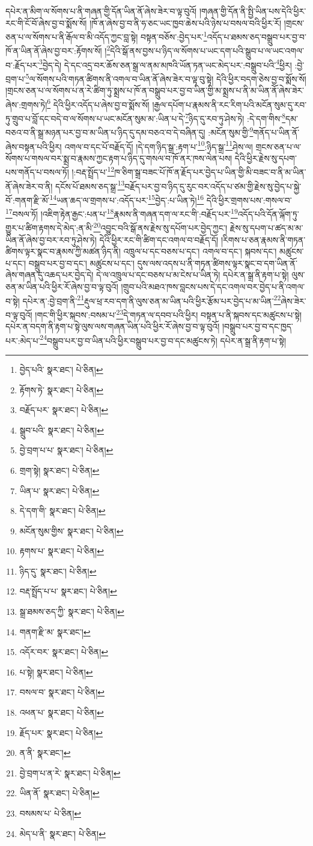 དཔེར་ན་མིག་ལ་སོགས་པ་ནི་གཞན་གྱི་དོན་ཡིན་ནོ་ཞེས་ཟེར་བ་ལྟ་བུའོ། །གཞན་གྱི་དོན་ནི་སྤྱི་ཡིན་པས་དེའི་ཕྱིར་རང་གི་ངོ་བོ་ཞེས་བྱ་བ་སྨོས་སོ། །ཁོ་ན་ཞེས་བྱ་བ་ནི་ཧ་ཅང་ཡང་ཁྱབ་ཆེས་པའི་ཉེས་པ་བསལ་བའི་ཕྱིར་རོ། །གྲངས་ཅན་པ་ལ་སོགས་པ་ནི་རྒོལ་བ་མི་འདོད་ཀྱང་བླ་སྟེ། བསྟན་བཅོས་:བྱེད་པར་\footnote{བྱེད་པའི་  སྣར་ཐང་།  པེ་ཅིན། }འདོད་པ་ཐམས་ཅད་བསྒྲུབ་པར་བྱ་བ་ཁོ་ན་ཡིན་ནོ་ཞེས་བྱ་བར་:རྟོགས་སོ། །\footnote{རྟོགས་ཏེ་  སྣར་ཐང་།  པེ་ཅིན། }དེའི་སྒོ་ནས་བྱས་པ་ཉིད་ལ་སོགས་པ་ཡང་དག་པའི་སྒྲུབ་པ་ལ་ཡང་འགལ་བ་:རྗོད་པར་\footnote{བརྗོད་པར་  སྣར་ཐང་།  པེ་ཅིན། }བྱེད་དེ། དེ་དང་འདྲ་བར་ཆོས་ཅན་སྒྲ་ལ་ནམ་མཁའི་ཡོན་ཏན་ཡང་མེད་པར་:བསྒྲུབ་པའི་\footnote{སྒྲུབ་པའི་  སྣར་ཐང་།  པེ་ཅིན། }ཕྱིར། :བྱེ་བྲག་པ་\footnote{བྱེ་བྲག་པ་པ་  སྣར་ཐང་།  པེ་ཅིན། }ལ་སོགས་པའི་གཏན་ཚིགས་ནི་འགལ་བ་ཡིན་ནོ་ཞེས་ཟེར་བ་ལྟ་བུ་སྟེ། དེའི་ཕྱིར་བདག་ཅེས་བྱ་བ་སྨོས་སོ། །གྲངས་ཅན་པ་ལ་སོགས་པ་ན་རེ་ཚིག་ཏུ་སྨྲས་པ་ཁོ་ན་བསྒྲུབ་པར་བྱ་བ་ཡིན་གྱི་མ་སྨྲས་པ་ནི་མ་ཡིན་ནོ་ཞེས་ཟེར་ཞེས་:གྲགས་ཏེ།\footnote{གྲག་སྟེ།  སྣར་ཐང་།  པེ་ཅིན། } དེའི་ཕྱིར་འདོད་པ་ཞེས་བྱ་བ་སྨོས་སོ། །རྒྱལ་དཔོག་པ་རྣམས་ནི་རང་རིག་པའི་མངོན་སུམ་དུ་རབ་ཏུ་གྲུབ་པ་བློ་དང་བདེ་བ་ལ་སོགས་པ་ཡང་མངོན་སུམ་མ་:ཡིན་པ་དེ་\footnote{ཡིན་པ་  སྣར་ཐང་།  པེ་ཅིན། }ཉིད་དུ་རབ་ཏུ་ཤེས་ཏེ། :དེ་དག་གིས་\footnote{དེ་དག་གི་  སྣར་ཐང་།  པེ་ཅིན། }དམ་བཅའ་བ་ནི་སྒྲ་མཉན་པར་བྱ་བ་མ་ཡིན་པ་ཉིད་དུ་དམ་བཅའ་བ་དེ་བཞིན་དུ། :མངོན་སུམ་གྱི་\footnote{མངོན་སུམ་གྱིས་  སྣར་ཐང་།  པེ་ཅིན། }གནོད་པ་ཡིན་ནོ་ཞེས་བསྟན་པའི་ཕྱིར། འགལ་བ་དང་པོ་བརྗོད་དོ། །དེ་དག་ཉིད་སྒྲ་:རྟག་པ་\footnote{རྟགས་པ་  སྣར་ཐང་།  པེ་ཅིན། }:ཉིད་སྒྲ་\footnote{ཉིད་དུ་  སྣར་ཐང་།  པེ་ཅིན། }ཤེས་ལ། གྲངས་ཅན་པ་ལ་སོགས་པ་གསལ་བར་སྨྲ་བ་རྣམས་ཀྱང་རྟག་པ་ཉིད་དུ་གསལ་བ་ཁོ་ནར་ཁས་ལེན་པས། དེའི་ཕྱིར་རྗེས་སུ་དཔག་པས་གནོད་པ་བསལ་ཏོ། །:བརྡ་སྤྲོད་པ་\footnote{བརྡ་སྤྲོད་པ་པ་  སྣར་ཐང་།  པེ་ཅིན། }ཁ་ཅིག་སྒྲ་བཟང་པོ་ཁོ་ན་རྗོད་པར་བྱེད་པ་ཡིན་གྱི་མི་བཟང་བ་ནི་མ་ཡིན་ནོ་ཞེས་ཟེར་བ་ནི། དངོས་པོ་ཐམས་ཅད་སྒྲ་\footnote{སྒྲ་ཐམས་ཅད་ཀྱི་  སྣར་ཐང་།  པེ་ཅིན། }བརྗོད་པར་བྱ་བ་ཉིད་དུ་རུང་བར་འདོད་པ་ཙམ་གྱི་རྗེས་སུ་བྱེད་པ་སྐྱེ་བོ་:གནག་རྫི་མོ་\footnote{གནག་རྫི་མ་  སྣར་ཐང་། }ཡན་ཆད་ལ་གྲགས་པ་:འདོད་པར་\footnote{འདོར་བར་  སྣར་ཐང་།  པེ་ཅིན། }བྱེད་:པ་ཡིན་ཏེ།\footnote{པ་སྟེ།  སྣར་ཐང་།  པེ་ཅིན། } དེའི་ཕྱིར་གྲགས་པས་:གསལ་བ་\footnote{བསལ་བ་  སྣར་ཐང་།  པེ་ཅིན། }བསལ་ཏོ། །འཇིག་རྟེན་རྒྱང་:པན་པ་\footnote{འཕན་པ་  སྣར་ཐང་།  པེ་ཅིན། }རྣམས་ནི་གཞན་དག་ལ་རང་གི་:བརྗོད་པར་\footnote{རྗོད་པར་  སྣར་ཐང་།  པེ་ཅིན། }འདོད་པའི་དོན་ལྐོག་ཏུ་གྱུར་པ་ཚིག་རྟགས་དེ་མེད་:ན་མི་\footnote{ན་ནི་  སྣར་ཐང་། }འབྱུང་བའི་སྒོ་ནས་རྗེས་སུ་དཔོག་པར་བྱེད་ཀྱང་། རྗེས་སུ་དཔག་པ་ཚད་མ་མ་ཡིན་ནོ་ཞེས་བྱ་བར་རབ་ཏུ་ཤེས་ཏེ། དེའི་ཕྱིར་རང་གི་ཚིག་དང་འགལ་བ་བརྗོད་དོ། །རིགས་པ་ཅན་རྣམས་ནི་གཏན་ཚིགས་ལྟར་སྣང་བ་རྣམས་ཀྱི་མཚན་ཉིད་ནི། འཁྲུལ་པ་དང་བཅས་པ་དང་། འགལ་བ་དང་། སྐབས་དང་། མཚུངས་པ་དང་། བསྒྲུབ་པར་བྱ་བ་དང་། མཚུངས་པ་དང་། དུས་ལས་འདས་པ་ནི་གཏན་ཚིགས་ལྟར་སྣང་བ་དག་ཡིན་ནོ་ཞེས་གཞན་དུ་འཆད་པར་བྱེད་དེ། དེ་ལ་འཁྲུལ་པ་དང་བཅས་པ་མ་ངེས་པ་ཡིན་ཏེ། དཔེར་ན་སྒྲ་ནི་རྟག་པ་སྟེ། ལུས་ཅན་མ་ཡིན་པའི་ཕྱིར་རོ་ཞེས་བྱ་བ་ལྟ་བུའོ། །གྲུབ་པའི་མཐའ་ཁས་བླངས་པས་དེ་དང་འགལ་བར་བྱེད་པ་ནི་འགལ་བ་སྟེ། དཔེར་ན་:བྱེ་བྲག་ནི་\footnote{བྱེ་བྲག་པ་ན་རེ་  སྣར་ཐང་།  པེ་ཅིན། }རྡུལ་ཕྲ་རབ་དག་ནི་ལུས་ཅན་མ་ཡིན་པའི་ཕྱིར་རྩོམ་པར་བྱེད་པ་མ་ཡིན་\footnote{ཡིན་ནོ་  སྣར་ཐང་།  པེ་ཅིན། }ཞེས་ཟེར་བ་ལྟ་བུའོ། །གང་གི་ཕྱིར་སྐབས་:བསམ་པ་\footnote{བསམས་པ་  པེ་ཅིན། }དེ་གཏན་ལ་དབབ་པའི་ཕྱིར། བསྟན་པ་ནི་སྐབས་དང་མཚུངས་པ་སྟེ། དཔེར་ན་བདག་ནི་རྟག་པ་སྟེ་ལུས་ལས་གཞན་ཡིན་པའི་ཕྱིར་རོ་ཞེས་བྱ་བ་ལྟ་བུའོ། །བསྒྲུབ་པར་བྱ་བ་དང་ཁྱད་པར་:མེད་པ་\footnote{མེད་པ་ནི་  སྣར་ཐང་།  པེ་ཅིན། }བསྒྲུབ་པར་བྱ་བ་ཡིན་པའི་ཕྱིར་བསྒྲུབ་པར་བྱ་བ་དང་མཚུངས་ཏེ། དཔེར་ན་སྒྲ་ནི་རྟག་པ་སྟེ། 